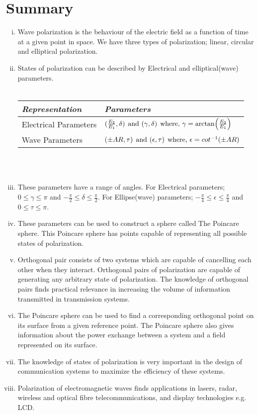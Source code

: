 \section{Summary}
\begin{enumerate}[(i)]
\item Wave polarization is the behaviour of the electric field as a function of time at a given point in space. We have three types of polarization; linear, circular and elliptical polarization.
\item States of polarization can be described by Electrical and elliptical(wave) parameters. \\
\\
\begin{tabular}{|l|m{4.5cm}|}
\hline 
\textit{Representation} &\textit{Parameters} \\ \hline %
Electrical Parameters &  $ (\frac{E_{2}}{E_{1}}, \delta)\hspace{0.15cm}  \text{and } (\gamma, \delta)\hspace{0.15cm} \text{where, } \gamma = \arctan(\frac{E_{2}}{E_{1}}) $\\  \hline     %
Wave Parameters & $ (\pm AR, \tau)\hspace{0.15cm}  \text{and } (\epsilon, \tau)\hspace{0.15cm} \text{where, } \epsilon = cot^{-1}(\pm AR) $ \\ \hline %
\end{tabular} \\
\\
\item These parameters have a range of angles. For Electrical parameters; $ 0 \leq \gamma \leq \pi $ and $ -\frac{\pi}{2} \leq \delta \leq \frac{\pi}{2}$. For Ellipse(wave) parameters; $ -\frac{\pi}{4} \leq \epsilon \leq \frac{\pi}{4}$ and $ 0 \leq \tau \leq \pi $.
\item These parameters can be used to construct a sphere called The Poincare sphere. This Poincare sphere has points capable of representing all possible states of polarization.
\item  Orthogonal pair consists of two systems which are capable of cancelling each other when they interact. Orthogonal pairs of polarization are capable of generating any arbitrary state of polarization. The knowledge of orthogonal pairs finds practical relevance in increasing the volume of information transmitted in transmission systems. 
\item The Poincare sphere can be used to find a corresponding orthogonal point on its surface from a given reference point. The Poincare sphere also gives information about the power exchange between a system and a field represented on its surface.
\item The knowledge of states of polarization is very important in the design of communication systems to maximize the efficiency of these systems. 
\item  Polarization of electromagnetic waves finds applications in lasers, radar, wireless and optical fibre telecommunications, and display technologies e.g. LCD.
\end{enumerate}
